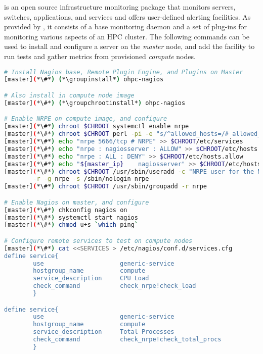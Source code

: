 \Nagios{} is an open source infrastructure monitoring package that monitors
servers, switches, applications, and services and offers user-defined alerting
facilities. As provided by \OHPC{}, it consists of a base monitoring daemon and
a set of plug-ins for monitoring various aspects of an HPC cluster.  The
following commands can be used to install and configure a \Nagios{} server on the {\em
master} node, and add the facility to run tests and gather metrics from
provisioned {\em compute} nodes.

\begin{lstlisting}[language=bash,keywords={},upquote=true]
# Install Nagios base, Remote Plugin Engine, and Plugins on Master
[master](*\#*) (*\groupinstall*) ohpc-nagios

# Also install in compute node image
[master](*\#*) (*\groupchrootinstall*) ohpc-nagios

# Enable NRPE on compute image, and configure
[master](*\#*) chroot $CHROOT systemctl enable nrpe
[master](*\#*) chroot $CHROOT perl -pi -e "s/^allowed_hosts=/# allowed_hosts=/" /etc/nagios/nrpe.cfg
[master](*\#*) echo "nrpe 5666/tcp # NRPE" >> $CHROOT/etc/services
[master](*\#*) echo "nrpe : nagiosserver : ALLOW" >> $CHROOT/etc/hosts.allow
[master](*\#*) echo "nrpe : ALL : DENY" >> $CHROOT/etc/hosts.allow
[master](*\#*) echo "${master_ip}    nagiosserver" >> $CHROOT/etc/hosts
[master](*\#*) chroot $CHROOT /usr/sbin/useradd -c "NRPE user for the NRPE service" -d /var/run/nrpe \
        -r -g nrpe -s /sbin/nologin nrpe
[master](*\#*) chroot $CHROOT /usr/sbin/groupadd -r nrpe

# Enable Nagios on master, and configure
[master](*\#*) chkconfig nagios on
[master](*\#*) systemctl start nagios
[master](*\#*) chmod u+s `which ping`

# Configure remote services to test on compute nodes
[master](*\#*) cat <<SERVICES > /etc/nagios/conf.d/services.cfg
define service{
        use                     generic-service
        hostgroup_name          compute
        service_description     CPU Load
        check_command           check_nrpe!check_load
        }

define service{
        use                     generic-service
        hostgroup_name          compute
        service_description     Total Processes
        check_command           check_nrpe!check_total_procs
        }


\end{lstlisting}
